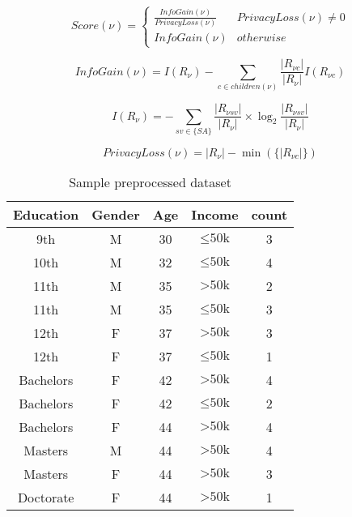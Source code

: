 \documentclass[11pt]{article}       %
\begin{document}
\begin{equation}
Score(\nu) = \begin{cases}
\frac{InfoGain(\nu)} {PrivacyLoss(\nu)} & PrivacyLoss(\nu) \neq 0\\
InfoGain(\nu) & otherwise
\end{cases}
\label{score}
\end{equation}

\begin{equation}
InfoGain(\nu) = I(R_\nu) - \sum\limits_{\text{$c$} \in children(\nu)} \frac{|R_{\nu\text{$c$}}|}{|R_\nu|} I(R_{\nu\text{$c$}})
\label{infoGain}
\end{equation}

\begin{equation}
I(R_\nu) = - \sum\limits_{sv \in \text{\{$SA$\}}} \frac{| R_{\nu\text{$sv$}} |}{ | R_\nu |} \times \log_2 \frac{| R_{\nu\text{$sv$}} |}{ | R_\nu |}
\label{entropy}
\end{equation}

\begin{equation}
PrivacyLoss(\nu) = |R_\nu| - \min(\{|R_{\nu c}|\})
\label{privacyLoss}
\end{equation}

\begin{table}[htp]
\begin{center}
\begin{tabular}{|c|c|c|c|c|}
\hline
Education & Gender & Age & Income & count \\
\hline
9th & M & 30 & $\leq \text{50k}$ & 3 \\
10th & M & 32 & $\leq \text{50k}$ & 4 \\
11th & M & 35 & $> \text{50k}$ & 2 \\
11th & M & 35 & $\leq \text{50k}$ & 3 \\
12th & F & 37 & $> \text{50k}$ & 3 \\
12th & F & 37 & $\leq \text{50k}$ & 1 \\
\hline
Bachelors & F & 42 & $> \text{50k}$ & 4 \\
Bachelors & F & 42 & $\leq \text{50k}$ & 2 \\
Bachelors & F & 44 & $> \text{50k}$ & 4 \\
Masters & M & 44 & $> \text{50k}$ & 4 \\
Masters & F & 44 & $> \text{50k}$ & 3 \\
Doctorate & F & 44 & $> \text{50k}$ & 1 \\
\hline
\end{tabular}
\end{center}
\caption{Sample preprocessed dataset}
\label{table2}
\end{table}
\end{document}
